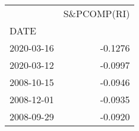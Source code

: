 \begin{tabular}{lr}
\toprule
{} &  S\&PCOMP(RI) \\
DATE       &              \\
\midrule
2020-03-16 &      -0.1276 \\
2020-03-12 &      -0.0997 \\
2008-10-15 &      -0.0946 \\
2008-12-01 &      -0.0935 \\
2008-09-29 &      -0.0920 \\
\bottomrule
\end{tabular}

